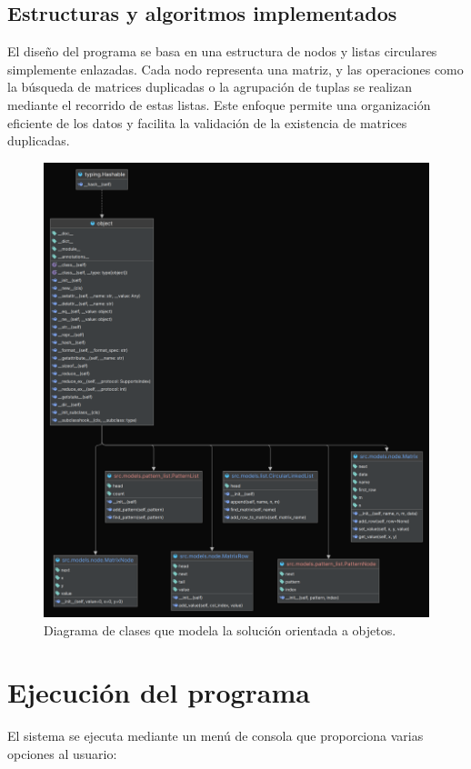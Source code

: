\documentclass[letterpaper,12pt]{article}
\begin{document}
\begin{multicols}{2}
    \subsection*{Estructuras y algoritmos implementados}
    El diseño del programa se basa en una estructura de nodos y listas circulares simplemente enlazadas. Cada nodo representa una matriz, y las operaciones como la búsqueda de matrices duplicadas o la agrupación de tuplas se realizan mediante el recorrido de estas listas. Este enfoque permite una organización eficiente de los datos y facilita la validación de la existencia de matrices duplicadas.

    \begin{figure}[H]
        \centering
        \includegraphics[width=\columnwidth]{images/class_diagram.png}
        \caption{Diagrama de clases que modela la solución orientada a objetos.}
    \end{figure}

    \newpage

    \section*{Ejecución del programa}
    El sistema se ejecuta mediante un menú de consola que proporciona varias opciones al usuario:


\end{multicols}
\end{document}
